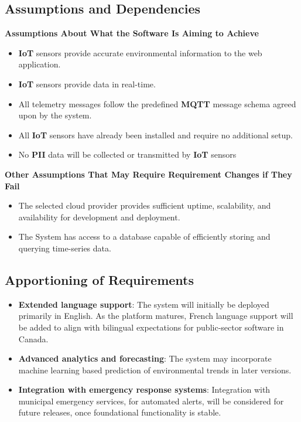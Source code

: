 \documentclass[]{article}
\begin{document}
\subsection{Assumptions and Dependencies}
\label{sub:assumptions_and_dependencies}
\textbf{Assumptions About What the Software Is Aiming to Achieve}
    \begin{itemize}
        \item \textbf{IoT} sensors provide accurate environmental information to the web application.
        \item \textbf{IoT} sensors provide data in real-time.
        \item All telemetry messages follow the predefined \textbf{MQTT} message schema agreed upon by the system.
        \item All \textbf{IoT} sensors have already been installed and require no additional setup.
        \item No \textbf{PII} data will be collected or transmitted by \textbf{IoT} sensors
    \end{itemize}

    \noindent\textbf{Other Assumptions That May Require Requirement Changes if They Fail}
    \begin{itemize}
        \item The selected cloud provider provides sufficient uptime, scalability, and availability for development and deployment.
        \item The System has access to a database capable of efficiently storing and querying time-series data. 
    \end{itemize}



\subsection{Apportioning of Requirements}
\label{sub:apportioning_of_requirements}
\begin{itemize}
    \item \textbf{Extended language support}: The system will initially be deployed primarily in English. As the platform matures, French language support will be added to align with bilingual expectations for public-sector software in Canada.
    
    \item \textbf{Advanced analytics and forecasting}: The system may incorporate machine learning based prediction of environmental trends in later versions.

    \item \textbf{Integration with emergency response systems}: Integration with municipal emergency services, for automated alerts, will be considered for future releases, once foundational functionality is stable.
\end{itemize}
\end{document}
